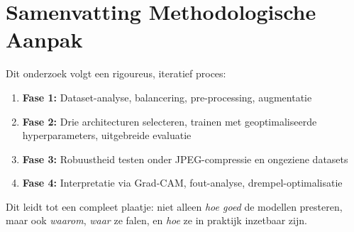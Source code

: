 


\section{Samenvatting Methodologische Aanpak}

Dit onderzoek volgt een rigoureus, iteratief proces:

\begin{enumerate}
    \item \textbf{Fase 1:} Dataset-analyse, balancering, pre-processing, augmentatie
    \item \textbf{Fase 2:} Drie architecturen selecteren, trainen met geoptimaliseerde hyperparameters, uitgebreide evaluatie
    \item \textbf{Fase 3:} Robuustheid testen onder JPEG-compressie en ongeziene datasets
    \item \textbf{Fase 4:} Interpretatie via Grad-CAM, fout-analyse, drempel-optimalisatie
\end{enumerate}

Dit leidt tot een compleet plaatje: niet alleen \textit{hoe goed} de modellen presteren, maar ook \textit{waarom}, \textit{waar} ze falen, en \textit{hoe} ze in praktijk inzetbaar zijn.

